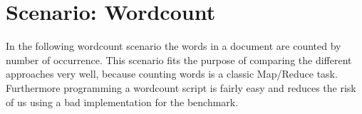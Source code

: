\section{Scenario: Wordcount}

In the following wordcount scenario the words in a document are counted by number of occurrence. This scenario fits the purpose of comparing the different approaches very well, because counting words is a classic Map/Reduce task. Furthermore programming a wordcount script is fairly easy and reduces the risk of us using a bad implementation for the benchmark.